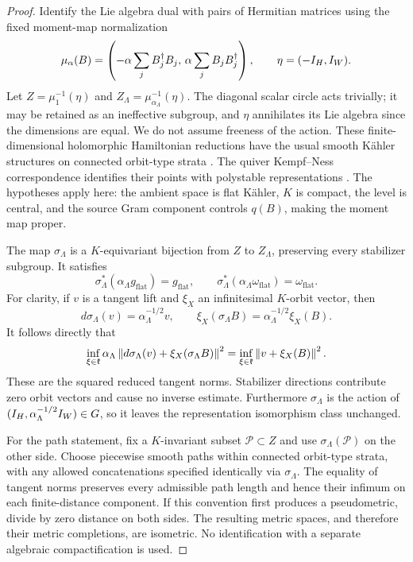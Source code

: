 \begin{proof}
Identify the Lie algebra dual with pairs of Hermitian matrices using
the fixed moment-map normalization
\[
 \mu_\alpha(B)=
 \left(-\alpha\sum_jB_j^\dagger B_j,\,
        \alpha\sum_jB_jB_j^\dagger\right),\qquad
 \eta=(-I_H,I_W).
\]
Let $Z=\mu_1^{-1}(\eta)$ and
$Z_\Lambda=\mu_{\alpha_\Lambda}^{-1}(\eta)$.
The diagonal scalar circle acts trivially; it may be retained as an
ineffective subgroup, and $\eta$ annihilates its Lie algebra since
the dimensions are equal. We do not assume freeness of the action.
These finite-dimensional holomorphic Hamiltonian reductions have
the usual smooth K\"ahler structures on connected orbit-type strata
\cite{sl91,sj95}. The quiver Kempf--Ness correspondence identifies
their points with polystable representations
\cite[\S6]{king94}. The hypotheses apply here: the ambient space is
flat K\"ahler, $K$ is compact, the level is central, and the source
Gram component controls $q(B)$, making the moment map proper.

The map $\sigma_\Lambda$ is a $K$-equivariant bijection from $Z$
to $Z_\Lambda$, preserving every stabilizer subgroup. It satisfies
\[
 \sigma_\Lambda^*(\alpha_\Lambda g_{\mathrm{flat}})
 =g_{\mathrm{flat}},\qquad
 \sigma_\Lambda^*(\alpha_\Lambda\omega_{\mathrm{flat}})
 =\omega_{\mathrm{flat}}.
\]
For clarity, if $v$ is a tangent lift and $\xi_X$ an infinitesimal
$K$-orbit vector, then
\[
 d\sigma_\Lambda(v)=\alpha_\Lambda^{-1/2}v,\qquad
 \xi_X(\sigma_\Lambda B)=\alpha_\Lambda^{-1/2}\xi_X(B).
\]
It follows directly that
\[
 \inf_{\xi\in\mathfrak k}
 \alpha_\Lambda\left\lVert d\sigma_\Lambda(v)+\xi_X(\sigma_\Lambda B)\right\rVert^2
 =\inf_{\xi\in\mathfrak k}\left\lVert v+\xi_X(B)\right\rVert^2.
\]
These are the squared reduced tangent norms. Stabilizer directions contribute
zero orbit vectors and cause no inverse estimate.
Furthermore $\sigma_\Lambda$ is the action of
$(I_H,\alpha_\Lambda^{-1/2}I_W)\in G$, so it leaves the
representation isomorphism class unchanged.

For the path statement, fix a $K$-invariant subset $\mathcal P\subset Z$
and use $\sigma_\Lambda(\mathcal P)$ on the other side.
Choose piecewise smooth paths within connected orbit-type strata,
with any allowed concatenations specified identically via
$\sigma_\Lambda$. The equality of tangent norms preserves every
admissible path length and hence their infimum on each finite-distance
component. If this convention first produces a pseudometric, divide
by zero distance on both sides. The resulting metric spaces, and
therefore their metric completions, are isometric.
No identification with a separate algebraic compactification is used.
\end{proof}

